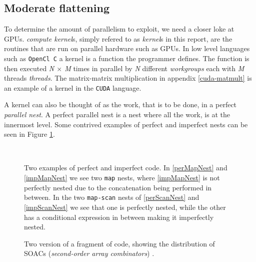 \subsection{Moderate flattening}
To determine the amount of parallelism to exploit, we need a closer loke at
GPUs. \textit{compute kernel}s, simply refered to as \textit{kernel}s in this
report, are the routines that are run on parallel hardware such as GPUs.  
In low level languages such as \texttt{OpenCl C} a kernel is a function the
programmer defines. The function is then executed \textit{N $\times$ M} times in parallel by
\textit{N} different \textit{workgroups} each with \textit{M} threads \textit{threads}.
The matrix-matrix multiplication in appendix \ref{cuda-matmult} is an example
of a kernel in the \texttt{CUDA} language.

A kernel can also be thought of as the work, that is to be done, in a perfect
\textit{parallel nest}. A perfect parallel nest is a nest where all the work,
is at the innermost level. Some contrived examples of perfect and imperfect
nests can be seen in Figure \ref{nests}.

\begin{figure}[h]
	\centering
	\hspace{2cm}
	\\
	\hspace{2cm}
	\caption{Two examples of perfect and imperfect code. In \ref{perMapNest} and \ref{impMapNest} we see two \texttt{map} nests, where \ref{impMapNest} is not perfectly nested due to the concatenation being performed in between. In the two \texttt{map-scan} nests of \ref{perScanNest} and \ref{impScanNest} we see that one is perfectly nested, while the other has a conditional expression in between making it imperfectly nested.}
	\label{nests}
\end{figure}
\begin{figure}[H]
\centering
	\hspace{2cm}
	\caption{Two version of a fragment of code, showing the distribution of SOACs (\textit{second-order array combinators}) \cite{futhark-moderate-blog}.}
	\label{loopDist}
\end{figure}

